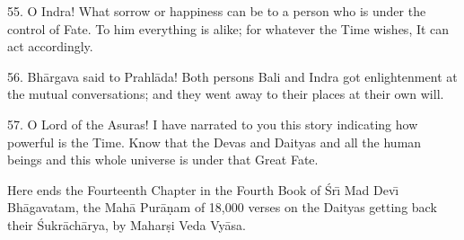 55. O Indra! What sorrow or happiness can be to a person who is under the control of Fate. To him everything is alike; for whatever the Time wishes, It can act accordingly.

56. Bh\=argava said to Prahl\=ada! Both persons Bali and Indra got enlightenment at the mutual conversations; and they went away to their places at their own will.

57. O Lord of the Asuras! I have narrated to you this story indicating how powerful is the Time. Know that the Devas and Daityas and all the human beings and this whole universe is under that Great Fate.

Here ends the Fourteenth Chapter in the Fourth Book of \'Sr\={\i} Mad Dev\={\i} Bh\=agavatam, the Mah\=a Pur\=a\d{n}am of 18,000 verses on the Daityas getting back their \'Sukr\=ach\=arya, by Mahar\d{s}i Veda Vy\=asa.



